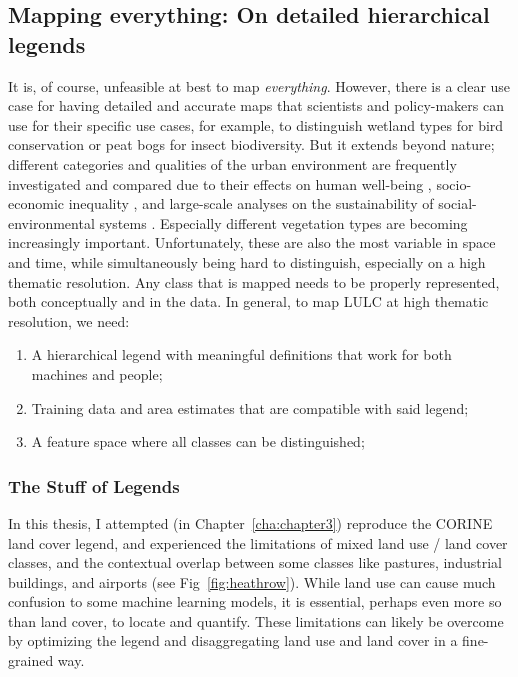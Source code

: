     \subsection{Mapping everything: On detailed hierarchical legends}
    \label{syn:everything}

        It is, of course, unfeasible at best to map \textit{everything}. However, there is a clear use case for having detailed and accurate maps that scientists and policy-makers can use for their specific use cases, for example, to distinguish wetland types for bird conservation \citep{fan2021function} or peat bogs \citep{spitzer2006insect} for insect biodiversity. But it extends beyond nature; different categories and qualities of the urban environment are frequently investigated and compared due to their effects on human well-being \citep{krekel2016greener}, socio-economic inequality \citep{tian2024urban}, and large-scale analyses on the sustainability of social-environmental systems \citep{chen2022sustainability}. Especially different vegetation types are becoming increasingly important. Unfortunately, these are also the most variable in space and time, while simultaneously being hard to distinguish, especially on a high thematic resolution. Any class that is mapped needs to be properly represented, both conceptually and in the data. In general, to map LULC at high thematic resolution, we need:
        \begin{enumerate}
        \item A hierarchical legend with meaningful definitions that work for both machines and people;
        \item Training data and area estimates that are compatible with said legend;
        \item A feature space where all classes can be distinguished;
        \end{enumerate}

        \subsubsection{The Stuff of Legends}
        \label{syn:everything-legends}

        In this thesis, I attempted (in Chapter\@~\ref{cha:chapter3}) reproduce the CORINE land cover legend, and experienced the limitations of mixed land use / land cover classes, and the contextual overlap between some classes like pastures, industrial buildings, and airports (see Fig\@~\ref{fig:heathrow}). While land use can cause much confusion to some machine learning models, it is essential, perhaps even more so than land cover, to locate and quantify. These limitations can likely be overcome by optimizing the legend and disaggregating land use and land cover in a fine-grained way.
        

